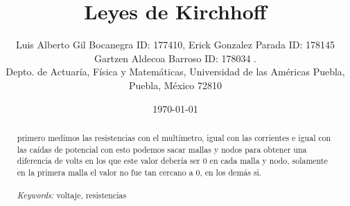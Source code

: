\documentclass{article}
\begin{document}

\renewcommand{\footrulewidth}{1pt}
\renewcommand{\tablename}{Tabla}
\renewcommand{\figurename}{Figura}


\title{Leyes de Kirchhoff}
\author{\small{Luis Alberto Gil Bocanegra ID: 177410, Erick Gonzalez Parada ID: 178145}\\
 \small{Gartzen Aldecoa Barroso ID: 178034 .}\\		%
	   \small{Depto. de Actuaría, Física y Matemáticas, Universidad de las Américas Puebla, Puebla, M\'exico 72810}}
\date{\small{\today}}

\maketitle


\begin{abstract}
primero medimos las resistencias con el multímetro, igual con las corrientes e igual con las caídas de potencial
con esto podemos sacar mallas y nodos para obtener una diferencia de volts en los que este valor debería ser 0
en cada malla y nodo, solamente en la primera malla el valor no fue tan cercano a 0, en los demás si. 
\\
\\
{\it Keywords:}  voltaje, resistencias 
\\
\\
\end{abstract}
\end{document}
